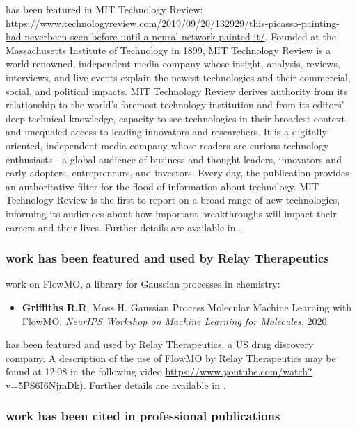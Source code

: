 \documentclass[11pt]{article}
\begin{document}
has been featured in MIT Technology Review: \url{https://www.technologyreview.com/2019/09/20/132929/this-picasso-painting-had-neverbeen-seen-before-until-a-neural-network-painted-it/}. Founded at the Massachusetts Institute of Technology in 1899, MIT Technology Review is a world-renowned, independent media company whose insight, analysis, reviews, interviews, and live events explain the newest technologies and their commercial, social, and political impacts. MIT Technology Review derives authority from its relationship to the world's foremost technology
institution and from its editors' deep technical knowledge, capacity to see technologies in their broadest context, and unequaled access to leading innovators and researchers. It is a digitally-oriented, independent media company whose readers are curious technology enthusiasts—a global audience of business and thought leaders, innovators and early adopters, entrepreneurs, and investors. Every day, the publication provides an authoritative filter for the flood of information about technology. MIT Technology Review is the first to report on a broad range of new technologies, informing its audiences about how important breakthroughs will impact their careers and their lives. Further details are available in \cite{media}.

\subsubsection{\drs work has been featured and used by Relay Therapeutics}
\label{relay}

\drs work on FlowMO, a library for Gaussian processes in chemistry:

\begin{itemize}
\item \textbf{Griffiths R.R}, Moss H. Gaussian Process Molecular Machine Learning with FlowMO. \textit{NeurIPS Workshop on Machine Learning for Molecules}, 2020.
\end{itemize}

has been featured and used by Relay Therapeutics, a US drug discovery company. A description of the use of FlowMO by Relay Therapeutics may be found at 12:08 in the following video \url{https://www.youtube.com/watch?v=5PS6I6NjmDk)}. Further details are available in \cite{media}.

\subsubsection{\drs work has been cited in professional publications}
\label{citations}
\end{document}
